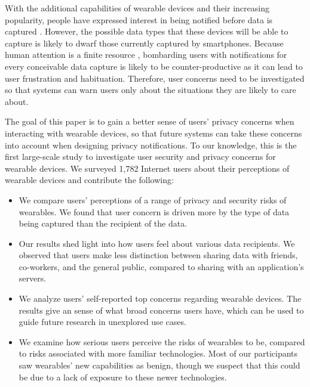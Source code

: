 With the additional capabilities of wearable devices and their increasing popularity, people have expressed interest in being notified before data is captured \cite{denning2014situ}. However, the possible data types that these devices will be able to capture is likely to dwarf those currently captured by smartphones. Because human attention is a finite resource \cite{bohme2011security}, bombarding users with notifications for every conceivable data capture is likely to be counter-productive as it can lead to user frustration and habituation. Therefore, user concerns need to be investigated so that systems can warn users only about the situations they are likely to care about.

The goal of this paper is to gain a better sense of users' privacy concerns when interacting with wearable devices, so that future systems can take these concerns into account when designing privacy notifications. To our knowledge, this is the first large-scale study to investigate user security and privacy concerns for wearable devices. We surveyed 1,782 Internet users about their perceptions of wearable devices and contribute the following: %

\begin{itemize} \itemsep1pt \parskip0pt 
\item We compare users' perceptions of a range of privacy and security risks of wearables. We found that user concern is driven more by the type of data being captured than the recipient of the data.
\item Our results shed light into how users feel about various data recipients. We observed that users make less distinction between sharing data with friends, co-workers, and the general public, compared to sharing with an application's servers.
\item We analyze users' self-reported top concerns regarding wearable devices. The results give an sense of what broad concerns users have, which can be used to guide future research in unexplored use cases. 
\item We examine how serious users perceive the risks of wearables to be, compared to risks associated with more familiar technologies. Most of our participants saw wearables' new capabilities as benign, though we suspect that this could be due to a lack of exposure to these newer technologies.
\end{itemize}
